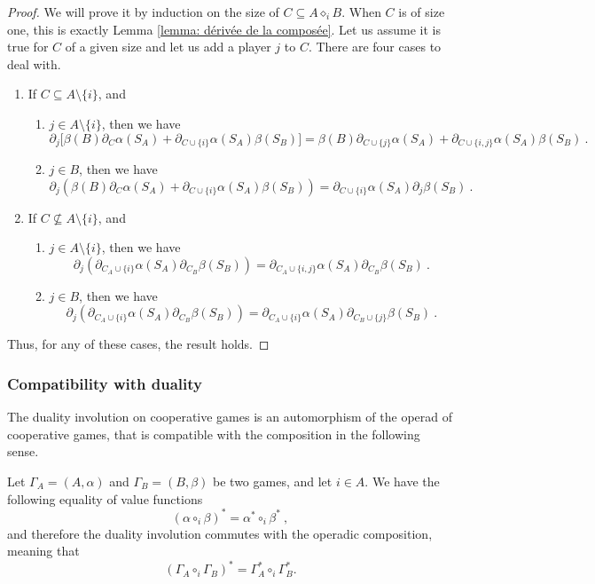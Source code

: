 \documentclass[a4paper,12pt]{amsart}
\begin{document}
\begin{proof}
We will prove it by induction on the size of $C \subseteq A \diamond_i B$. When $C$ is of size one, this is exactly Lemma \ref{lemma: dérivée de la composée}. Let us assume it is true for $C$ of a given size and let us add a player $j$ to $C$. There are four cases to deal with. 

\begin{enumerate}
\item If $C \subseteq A \setminus \{i\}$, and
\begin{enumerate} 
\item $j \in A \setminus \{i\}$, then we have 
\[
\partial_j \big[ \beta(B)\partial_{C}\alpha(S_A) + \partial_{C \cup \{i\}}\alpha(S_A)\beta(S_B) \big] = \beta(B)\partial_{C \cup \{j\}}\alpha(S_A) + \partial_{C \cup \{i,j\}}\alpha(S_A)\beta(S_B)~. 
\]

\item $j \in B$, then we have 
\[
\partial_j(\beta(B)\partial_{C}\alpha(S_A) + \partial_{C \cup \{i\}}\alpha(S_A)\beta(S_B)) = \partial_{C \cup \{i\}}\alpha(S_A)\partial_j\beta(S_B)~. 
\]
\end{enumerate}

\item If $C \nsubseteq A \setminus \{i\}$, and 
\begin{enumerate} 
\item $j \in A \setminus \{i\}$, then we have
\[
\partial_j(\partial_{C_A \cup \{i\}}\alpha(S_A)\partial_{C_B}\beta(S_B)) = \partial_{C_A \cup \{i,j\}}\alpha(S_A)\partial_{C_B}\beta(S_B)~. 
\]

\item $j \in B$, then we have 
\[
\partial_j(\partial_{C_A \cup \{i\}}\alpha(S_A)\partial_{C_B}\beta(S_B)) = \partial_{C_A \cup \{i\}}\alpha(S_A)\partial_{C_B \cup \{j\}}\beta(S_B)~. 
\]
\end{enumerate}
\end{enumerate}
Thus, for any of these cases, the result holds.
\end{proof}

\subsubsection{Compatibility with duality} The duality involution on cooperative games is an automorphism of the operad of cooperative games, that is compatible with the composition in the following sense.

\begin{proposition}\label{prop: compatibility of the composition and duality}
Let $\Gamma_A = (A, \alpha)$ and $\Gamma_B = (B, \beta)$ be two games, and let $i \in A$. We have the following equality of value functions
\[
(\alpha \circ_i \beta)^* = \alpha^* \circ_i \beta^*~, 
\]
and therefore the duality involution commutes with the operadic composition, meaning that
\[
(\Gamma_A \circ_i \Gamma_B)^* = \Gamma_A^* \circ_i \Gamma_B^*.
\]
\end{proposition}
\end{document}
